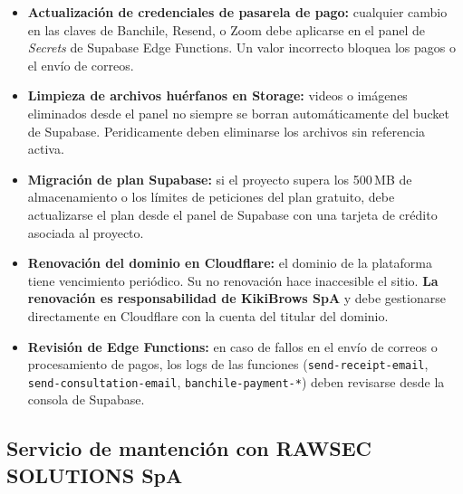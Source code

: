 \documentclass[a4paper,11pt]{article}
\begin{document}
\begin{itemize}
  \item \textbf{Actualizaci\'on de credenciales de pasarela de pago:} cualquier
        cambio en las claves de Banchile, Resend, o Zoom debe aplicarse en el
        panel de \emph{Secrets} de Supabase Edge Functions. Un valor incorrecto
        bloquea los pagos o el env\'io de correos.

  \item \textbf{Limpieza de archivos hu\'erfanos en Storage:} videos o im\'agenes
        eliminados desde el panel no siempre se borran autom\'aticamente del
        bucket de Supabase. Peridicamente deben eliminarse los archivos sin
        referencia activa.

  \item \textbf{Migraci\'on de plan Supabase:} si el proyecto supera los 500\,MB
        de almacenamiento o los l\'imites de peticiones del plan gratuito, debe
        actualizarse el plan desde el panel de Supabase con una tarjeta de
        cr\'edito asociada al proyecto.

  \item \textbf{Renovaci\'on del dominio en Cloudflare:} el dominio de la
        plataforma tiene vencimiento peri\'odico. Su no renovaci\'on hace
        inaccesible el sitio. \textbf{La renovaci\'on es responsabilidad de
        KikiBrows SpA} y debe gestionarse directamente en Cloudflare con
        la cuenta del titular del dominio.

  \item \textbf{Revisi\'on de Edge Functions:} en caso de fallos en el env\'io
        de correos o procesamiento de pagos, los logs de las funciones
        (\texttt{send-receipt-email}, \texttt{send-consultation-email},
        \texttt{banchile-payment-*}) deben revisarse desde la consola de Supabase.
\end{itemize}

\subsection{Servicio de mantenci\'on con RAWSEC SOLUTIONS SpA}
\end{document}
